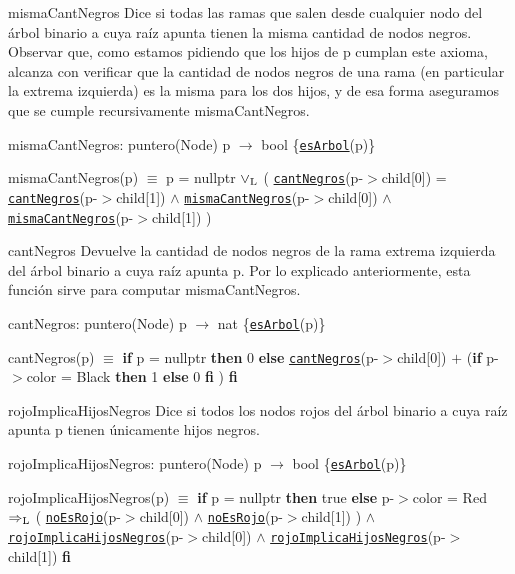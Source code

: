 \begin{DoxyParagraph}{misma\-Cant\-Negros}
Dice si todas las ramas que salen desde cualquier nodo del árbol binario a cuya raíz apunta tienen la misma cantidad de nodos negros. Observar que, como estamos pidiendo que los hijos de p cumplan este axioma, alcanza con verificar que la cantidad de nodos negros de una rama (en particular la extrema izquierda) es la misma para los dos hijos, y de esa forma aseguramos que se cumple recursivamente misma\-Cant\-Negros.

misma\-Cant\-Negros\-: puntero(\-Node) p $\to$ bool \{\href{axiomas.html#esArbol}{\tt es\-Arbol}(p)\} \par
 misma\-Cant\-Negros(p) $\equiv$ p = nullptr $\lor_{\rm L}$ ( \href{axiomas.html#cantNegros}{\tt cant\-Negros}(p-\/$>$child\mbox{[}0\mbox{]}) = \href{axiomas.html#cantNegros}{\tt cant\-Negros}(p-\/$>$child\mbox{[}1\mbox{]}) $\land$ \href{axiomas.html#mismaCantNegros}{\tt misma\-Cant\-Negros}(p-\/$>$child\mbox{[}0\mbox{]}) $\land$ \href{axiomas.html#mismaCantNegros}{\tt misma\-Cant\-Negros}(p-\/$>$child\mbox{[}1\mbox{]}) )


\end{DoxyParagraph}
\begin{DoxyParagraph}{cant\-Negros}
Devuelve la cantidad de nodos negros de la rama extrema izquierda del árbol binario a cuya raíz apunta p. Por lo explicado anteriormente, esta función sirve para computar misma\-Cant\-Negros.

cant\-Negros\-: puntero(\-Node) p $\to$ nat \{\href{axiomas.html#esArbol}{\tt es\-Arbol}(p)\} \par
 cant\-Negros(p) $\equiv$ {\bfseries if} p = nullptr {\bfseries then} 0 {\bfseries else} \href{axiomas.html#cantNegros}{\tt cant\-Negros}(p-\/$>$child\mbox{[}0\mbox{]}) $+$ ({\bfseries if} p-\/$>$color = Black {\bfseries then} 1 {\bfseries else} 0 {\bfseries fi} ) {\bfseries fi} 


\end{DoxyParagraph}
\begin{DoxyParagraph}{rojo\-Implica\-Hijos\-Negros}
Dice si todos los nodos rojos del árbol binario a cuya raíz apunta p tienen únicamente hijos negros.

rojo\-Implica\-Hijos\-Negros\-: puntero(\-Node) p $\to$ bool \{\href{axiomas.html#esArbol}{\tt es\-Arbol}(p)\} \par
 rojo\-Implica\-Hijos\-Negros(p) $\equiv$ {\bfseries if} p = nullptr {\bfseries then} true {\bfseries else} p-\/$>$color = Red $\Rightarrow_{\rm L}$ ( \href{axiomas.html#noEsRojo}{\tt no\-Es\-Rojo}(p-\/$>$child\mbox{[}0\mbox{]}) $\land$ \href{axiomas.html#noEsRojo}{\tt no\-Es\-Rojo}(p-\/$>$child\mbox{[}1\mbox{]}) ) $\land$ \href{axiomas.html#rojoImplicaHijosNegros}{\tt rojo\-Implica\-Hijos\-Negros}(p-\/$>$child\mbox{[}0\mbox{]}) $\land$ \href{axiomas.html#rojoImplicaHijosNegros}{\tt rojo\-Implica\-Hijos\-Negros}(p-\/$>$child\mbox{[}1\mbox{]}) {\bfseries fi} 


\end{DoxyParagraph}

